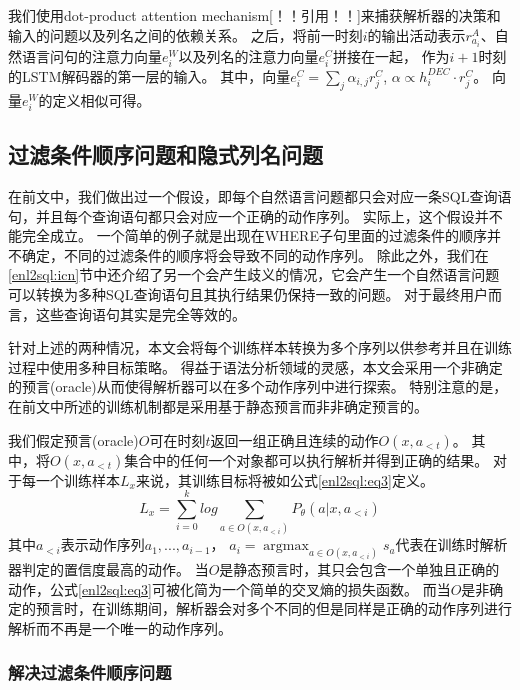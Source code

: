 我们使用dot-product attention mechanism[！！引用！！]来捕获解析器的决策和输入的问题以及列名之间的依赖关系。
之后，将前一时刻$i$的输出活动表示$r^A_{a_i}$、自然语言问句的注意力向量$e^W_i$以及列名的注意力向量$e^C_i$拼接在一起，
作为$i+1$时刻的LSTM解码器的第一层的输入。
其中，向量$e^C_i = \sum_j \alpha_{i,j} r^C_j$,  $\alpha \propto h^{DEC}_i \cdot r^C_j$。
向量$e^W_i$的定义相似可得。



\subsection{过滤条件顺序问题和隐式列名问题}
\label{enl2sql:ndo}

在前文中，我们做出过一个假设，即每个自然语言问题都只会对应一条SQL查询语句，并且每个查询语句都只会对应一个正确的动作序列。
实际上，这个假设并不能完全成立。
一个简单的例子就是出现在WHERE子句里面的过滤条件的顺序并不确定，不同的过滤条件的顺序将会导致不同的动作序列。
除此之外，我们在\ref{enl2sql:icn}节中还介绍了另一个会产生歧义的情况，它会产生一个自然语言问题可以转换为多种SQL查询语句且其执行结果仍保持一致的问题。
对于最终用户而言，这些查询语句其实是完全等效的。

针对上述的两种情况，本文会将每个训练样本转换为多个序列以供参考并且在训练过程中使用多种目标策略。
得益于语法分析领域的灵感，本文会采用一个非确定的预言(oracle)从而使得解析器可以在多个动作序列中进行探索。
特别注意的是，在前文中所述的训练机制都是采用基于静态预言而非非确定预言的。

我们假定预言(oracle)$O$可在时刻$t$返回一组正确且连续的动作$O(x,a_{<t})$。
其中，将$O(x,a_{<t})$集合中的任何一个对象都可以执行解析并得到正确的结果。
对于每一个训练样本$L_x$来说，其训练目标将被如公式\ref{enl2sql:eq3}定义。
\begin{equation}
  \label{enl2sql:eq3}
  L_x = \sum_{i=0}^k log \sum_{a\in O(x,a_{<i})} P_{\theta}(a|x,a_{<i})
\end{equation}
其中$a_{<i}$表示动作序列$a_{1},...,a_{i-1}$，
$a_{i} = \mathop{\arg\max}_{a\in O(x,a_{<i})} s_a $代表在训练时解析器判定的置信度最高的动作。
当$O$是静态预言时，其只会包含一个单独且正确的动作，公式\ref{enl2sql:eq3}可被化简为一个简单的交叉熵的损失函数。
而当$O$是非确定的预言时，在训练期间，解析器会对多个不同的但是同样是正确的动作序列进行解析而不再是一个唯一的动作序列。

\subsubsection{解决过滤条件顺序问题}
\label{enl2sql:om}

